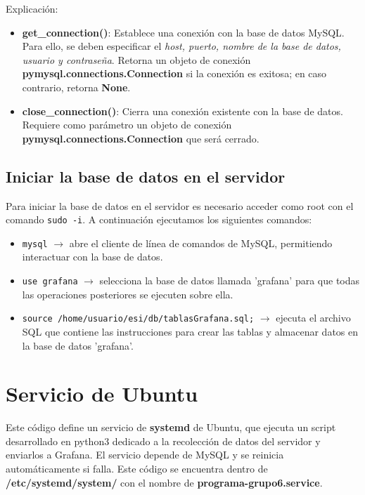 \documentclass{article}
\begin{document}
Explicación:

\begin{itemize}
    \item \textbf{get\_connection()}: Establece una conexión con la base de datos MySQL. Para ello, se deben especificar el \textit{host, puerto, nombre de la base de datos, usuario y contraseña}. Retorna un objeto de conexión \textbf{pymysql.connections.Connection} si la conexión es exitosa; en caso contrario, retorna \textbf{None}.
    \item \textbf{close\_connection()}: Cierra una conexión existente con la base de datos. Requiere como parámetro un objeto de conexión \textbf{pymysql.connections.Connection} que será cerrado.
\end{itemize}

\subsection{Iniciar la base de datos en el servidor}

Para iniciar la base de datos en el servidor es necesario acceder como root con el comando \lstinline{sudo -i}. A continuación ejecutamos los siguientes comandos:

\begin{itemize}
    \item \lstinline{mysql} $ \rightarrow $ abre el cliente de línea de comandos de MySQL, permitiendo interactuar con la base de datos.
    \item \lstinline{use grafana} $ \rightarrow $ selecciona la base de datos llamada 'grafana' para que todas las operaciones posteriores se ejecuten sobre ella.
    \item \lstinline{source /home/usuario/esi/db/tablasGrafana.sql;} $ \rightarrow $ ejecuta el archivo SQL que contiene las instrucciones para crear las tablas y almacenar datos en la base de datos 'grafana'.
\end{itemize}

\section{Servicio de Ubuntu}\label{sec:servicio-ubuntu}
Este código define un servicio de \textbf{systemd} de Ubuntu, que ejecuta un script desarrollado en python3 dedicado a la recolección de datos del servidor y enviarlos a Grafana. El servicio depende de MySQL y se reinicia automáticamente si falla.
Este código se encuentra dentro de \textbf{/etc/systemd/system/} con el nombre de \textbf{programa-grupo6.service}.
\end{document}
